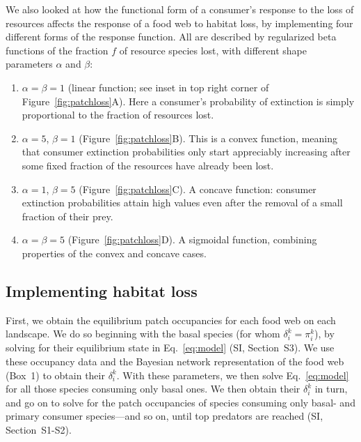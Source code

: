 \documentclass[11pt]{article}
\newcommand{\SI}{SI}
\begin{document}
We also looked at how the functional form of a consumer's response to the loss of resources affects the response of a food web to habitat loss, by implementing four different forms of the response function. All are described by regularized beta functions of the fraction $f$ of resource species lost, with different shape parameters $\alpha$ and $\beta$:
\begin{enumerate}
\item $\alpha = \beta = 1$ (linear function; see inset in top right corner of Figure~\ref{fig:patchloss}A). Here a consumer's probability of extinction is simply proportional to the fraction of resources lost.
\item $\alpha=5$, $\beta=1$ (Figure~\ref{fig:patchloss}B). This is a convex function, meaning that consumer extinction probabilities only start appreciably increasing after some fixed fraction of the resources have already been lost.
\item $\alpha=1$, $\beta=5$ (Figure~\ref{fig:patchloss}C). A concave function: consumer extinction probabilities attain high values even after the removal of a small fraction of their prey.
\item $\alpha = \beta = 5$ (Figure~\ref{fig:patchloss}D). A sigmoidal function, combining properties of the convex and concave cases.
\end{enumerate}


\subsection{Implementing habitat loss}

First, we obtain the equilibrium patch occupancies for each food web on each landscape. We do so beginning with the basal species (for whom $\delta_i^k = \pi_i^k$), by solving for their equilibrium state in Eq.~\ref{eq:model} (\SI, Section~S3). We use these occupancy data and the Bayesian network representation of the food web (Box~1) to obtain their $\delta_i^k$. With these parameters, we then solve Eq.~\ref{eq:model} for all those species consuming only basal ones. We then obtain their $\delta_i^k$ in turn, and go on to solve for the patch occupancies of species consuming only basal- and primary consumer species---and so on, until top predators are reached (\SI, Section~S1-S2).
\end{document}
